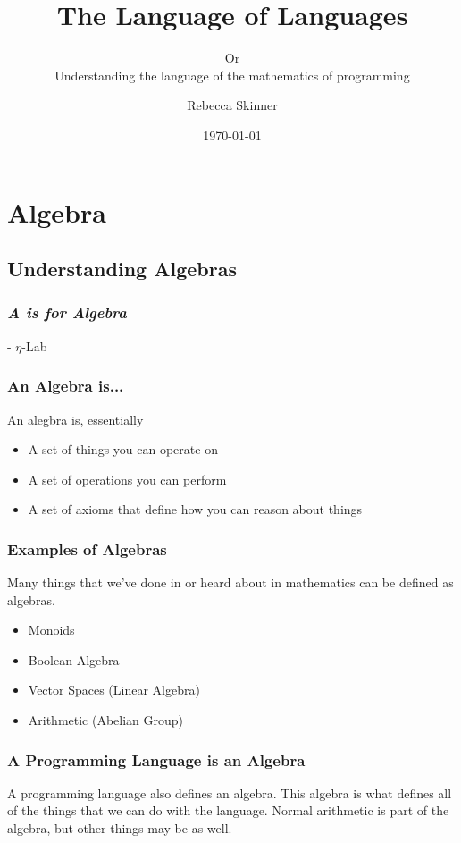 \documentclass{beamer}
\title{The Language of Languages}
\subtitle{Or \\ \small{Understanding the language of the mathematics of programming}}
\author{Rebecca Skinner}
\institute{CenturyLink Cloud}
\date{\today}
\begin{document}
\begin{frame}
  \titlepage{}
\end{frame}

\section{Algebra}
\subsection{Understanding Algebras}
\begin{frame}
  \frametitle{\it{A} is for Algebra}
   - $\eta$-Lab
\end{frame}

\begin{frame}
  \frametitle{An Algebra is...}
  An alegbra is, essentially
  \begin{itemize}
    \item A set of things you can operate on
    \item A set of operations you can perform
    \item A set of axioms that define how you can reason about things
  \end{itemize}
\end{frame}

\begin{frame}
  \frametitle{Examples of Algebras}
  Many things that we've done in or heard about in mathematics can be
  defined as algebras.
  \begin{itemize}
    \item Monoids
    \item Boolean Algebra
    \item Vector Spaces (Linear Algebra)
    \item Arithmetic (Abelian Group)
  \end{itemize}
\end{frame}

\begin{frame}
  \frametitle{A Programming Language is an Algebra}
  A programming language also defines an algebra. This algebra is what
  defines all of the things that we can do with the language. Normal
  arithmetic is part of the algebra, but other things may be as well.
\end{frame}
\end{document}
